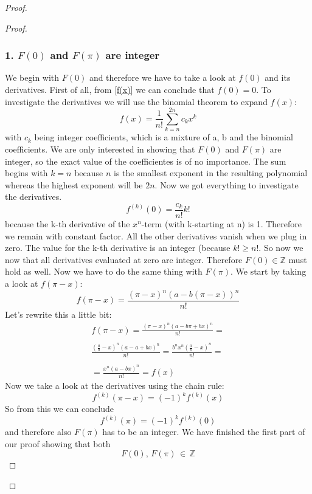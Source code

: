 \documentclass{article}
\theoremstyle{definition}
\begin{document}
\begin{proof}
\begin{proof}
\subsubsection*{1. $F(0)$ and $F(\pi)$ are integer }
We begin with $F(0)$ and therefore we have to take a look at $f(0)$ and its derivatives. First of all, from \ref{f(x)} we can conclude that $f(0)=0$. To investigate the derivatives we will use the binomial theorem to expand $f(x)$:
\begin{equation}
    f(x) = \frac{1}{n!} \sum _{k=n}^{2n}c_kx^k
\end{equation}
with $c_k$ being integer coefficients, which is a mixture of a, b and the binomial coefficients. We are only interested in showing that $F(0)$ and $F(\pi)$ are integer, so the exact value of the coefficientes is of no importance. The sum begins with $k=n$ because $n$ is the smallest exponent in the resulting polynomial whereas the highest exponent will be $2n$. Now we got everything to investigate the derivatives.
\begin{equation}
    f^{(k)}(0) = \frac{c_k}{n!}k!
\end{equation}
because the k-th derivative of the $x^n$-term (with k-starting at n) is 1. Therefore we remain with constant factor. All the other derivatives vanish when we plug in zero. The value for the k-th derivative is an integer (because $k!\geq n!$. So now we now that all derivatives evaluated at zero are integer. Therefore $F(0)\in \mathbb{Z}$ must hold as well. Now we have to do the same thing with $F(\pi)$.
We start by taking a look at $f(\pi-x)$:
\begin{equation}
    f(\pi-x) = \frac{(\pi-x)^n(a-b(\pi - x))^n}{n!}
\end{equation}
Let's rewrite this a little bit:
\begin{align*}
    f(\pi - x) = \frac{(\pi -x)^n (a -b\pi + bx)^n}{n!} = \\ \\
    \frac{(\frac{a}{b}-x)^n(a-a+bx)^n }{n!} = \frac{b^nx^n (\frac{a}{b}-x)^n}{n!} = \\ \\
    = \frac{x^n(a-bx)^n}{n!} = f(x)
\end{align*}
Now we take a look at the derivatives using the chain rule:
\begin{equation}
    f^{(k)}(\pi-x) = (-1)^k f^{(k)}(x)
\end{equation}
So from this we can conclude 
\begin{equation}
    f^{(k)}(\pi) = (-1)^k f^{(k)}(0)
\end{equation}
and therefore also $F(\pi)$ has to be an integer. We have finished the first part of our proof showing that both
\begin{equation}
    F(0), \, F(\pi) \, \in \, \mathbb{Z}
\end{equation}


\end{proof}
\end{proof}
\end{document}
